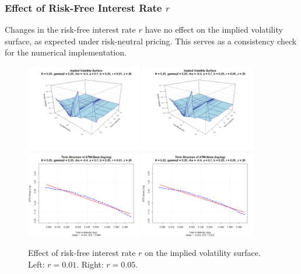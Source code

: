 \subsubsection*{Effect of Risk-Free Interest Rate $r$}
\begin{minipage}{\textwidth}
Changes in the risk-free interest rate $r$ have no effect on the implied volatility surface, as expected under risk-neutral pricing. This serves as a consistency check for the numerical implementation.
\begin{figure}[H]
    \centering
    \includegraphics[width=0.45\textwidth]{figures/5.2 Individual Parameter Effects/r=0.01_iv_surface.png}
	\includegraphics[width=0.45\textwidth]{figures/5.2 Individual Parameter Effects/r=0.05_iv_surface.png}
	\includegraphics[width=0.45\textwidth]{figures/5.2 Individual Parameter Effects/r=0.01_atm_skew_log.png}
	\includegraphics[width=0.45\textwidth]{figures/5.2 Individual Parameter Effects/r=0.05_atm_skew_log.png}
    \caption{Effect of risk-free interest rate $r$ on the implied volatility surface. Left: $r=0.01$. Right: $r=0.05$.}
    \label{fig:r_effect}
\end{figure}
\end{minipage}

